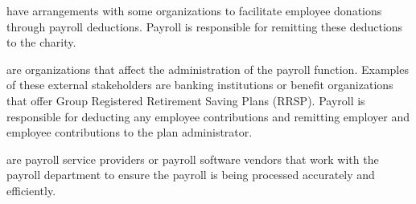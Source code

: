 \documentclass[letterpaper,10pt,english]{sphinxmanual}
\begin{document}
\sphinxAtStartPar
{} have arrangements with some organizations to facilitate employee donations
through payroll deductions. Payroll is responsible for remitting these deductions to the
charity.

\sphinxAtStartPar
{} are organizations that affect the administration of the payroll
function. Examples of these external stakeholders are banking institutions or benefit
organizations that offer Group Registered Retirement Saving Plans (RRSP). Payroll is
responsible for deducting any employee contributions and remitting employer and employee
contributions to the plan administrator.

\sphinxAtStartPar
{} are payroll service providers or payroll software vendors that
work with the payroll department to ensure the payroll is being processed accurately and
efficiently.
\end{document}
